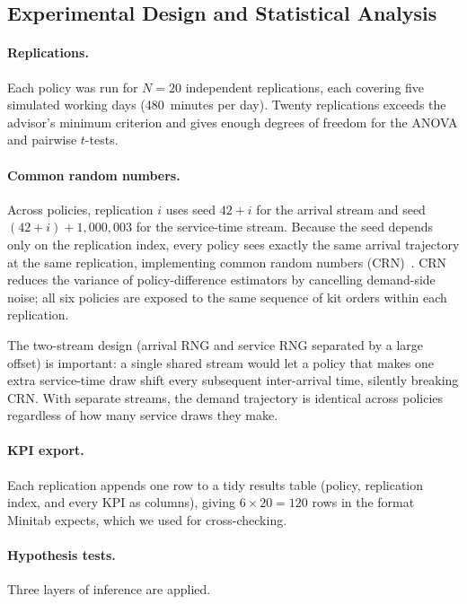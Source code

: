 \subsection{Experimental Design and Statistical Analysis}\label{sec:doe}

\paragraph{Replications.}
Each policy was run for $N = 20$ independent replications, each covering five
simulated working days (480~minutes per day). Twenty replications exceeds the
advisor's minimum criterion and gives enough degrees of freedom for the ANOVA
and pairwise $t$-tests.

\paragraph{Common random numbers.}
Across policies, replication $i$ uses seed $42 + i$ for the arrival stream
and seed $(42 + i) + 1{,}000{,}003$ for the service-time stream. Because the
seed depends only on the replication index, every policy sees exactly the
same arrival trajectory at the same replication, implementing common random
numbers (CRN)~\cite{law2015}. CRN reduces the variance of policy-difference
estimators by cancelling demand-side noise; all six policies are exposed to
the same sequence of kit orders within each replication.

The two-stream design (arrival RNG and service RNG separated by a large
offset) is important: a single shared stream would let a policy that makes
one extra service-time draw shift every subsequent inter-arrival time, silently
breaking CRN. With separate streams, the demand trajectory is identical
across policies regardless of how many service draws they make.

\paragraph{KPI export.}
Each replication appends one row to a tidy results table (policy,
replication index, and every KPI as columns), giving $6 \times 20 = 120$
rows in the format Minitab expects, which we used for cross-checking.

\paragraph{Hypothesis tests.}
Three layers of inference are applied.

